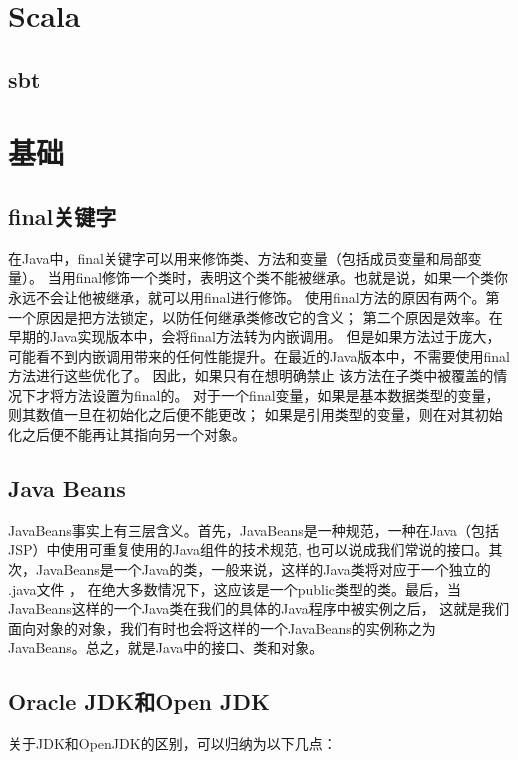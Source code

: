 \documentclass{book}
\begin{document}
\section{Scala}

\subsection{sbt}

\section{基础}

\subsection{final关键字}

在Java中，final关键字可以用来修饰类、方法和变量（包括成员变量和局部变量）。
当用final修饰一个类时，表明这个类不能被继承。也就是说，如果一个类你永远不会让他被继承，就可以用final进行修饰。
使用final方法的原因有两个。第一个原因是把方法锁定，以防任何继承类修改它的含义；
第二个原因是效率。在早期的Java实现版本中，会将final方法转为内嵌调用。
但是如果方法过于庞大，可能看不到内嵌调用带来的任何性能提升。在最近的Java版本中，不需要使用final方法进行这些优化了。
因此，如果只有在想明确禁止 该方法在子类中被覆盖的情况下才将方法设置为final的。
对于一个final变量，如果是基本数据类型的变量，则其数值一旦在初始化之后便不能更改；
如果是引用类型的变量，则在对其初始化之后便不能再让其指向另一个对象。

\subsection{Java Beans}

JavaBeans事实上有三层含义。首先，JavaBeans是一种规范，一种在Java（包括JSP）中使用可重复使用的Java组件的技术规范,
也可以说成我们常说的接口。其次，JavaBeans是一个Java的类，一般来说，这样的Java类将对应于一个独立的 .java文件 ，
在绝大多数情况下，这应该是一个public类型的类。最后，当JavaBeans这样的一个Java类在我们的具体的Java程序中被实例之后，
这就是我们面向对象的对象，我们有时也会将这样的一个JavaBeans的实例称之为JavaBeans。总之，就是Java中的接口、类和对象。

\subsection{Oracle JDK和Open JDK}

关于JDK和OpenJDK的区别，可以归纳为以下几点：
\end{document}
